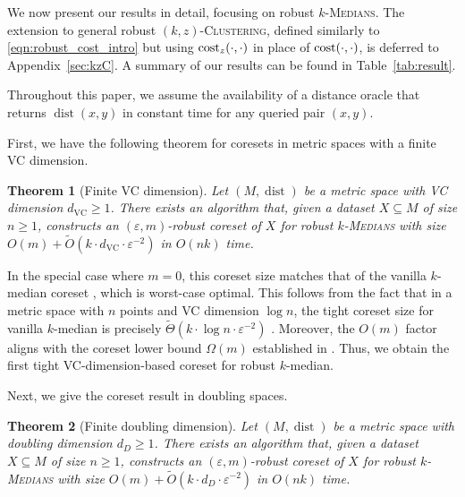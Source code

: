 \documentclass[11pt,letterpaper]{article}
\newtheorem{theorem}{Theorem}[section]
\theoremstyle{definition}
\newcommand{\eps}{\varepsilon}
\newcommand{\VC}{\ensuremath{\mathrm{VC}}}
\newcommand{\ProblemName}[1]{\textsc{#1}}
\newcommand{\kzC}{\ProblemName{$(k, z)$-Clustering}\xspace}
\newcommand{\kMedian}{\ProblemName{$k$-Medians}\xspace}
\DeclareMathOperator{\dist}{dist}
\begin{document}
We now present our results in detail, focusing on robust \kMedian.
The extension to general robust \kzC, defined similarly to \eqref{eqn:robust_cost_intro} but using 
$\cost_z(\cdot,\cdot)$ in place of $\cost(\cdot,\cdot)$, is deferred to Appendix~\ref{sec:kzC}. A summary of our results can be found in Table~\ref{tab:result}. 
%
%

Throughout this paper, we assume the availability of a distance oracle that returns \( \dist(x,y) \) in constant time for any queried pair \( (x,y) \).
%

First, we have the following theorem for coresets in metric spaces with a finite VC dimension.
%

\begin{theorem}[Finite VC dimension] \label{thm_gen} 
Let $(M,\dist)$ be a metric space with VC dimension $d_{\VC}\geq 1$. 
%
There exists an algorithm that, given a dataset $X\subseteq M$ of size $n\geq 1$, constructs an $(\eps,m)$-robust coreset of 
$X$ for robust \kMedian with size $O(m)+\tilde{O}(k\cdot d_{\VC}\cdot \eps^{-2})$ in $O(nk)$ time.
\end{theorem}

In the special case where \( m = 0 \), this coreset size matches that of the vanilla \( k \)-median coreset \cite{Cohen25}, which is worst-case optimal. 
%
This follows from the fact that in a metric space with $n$ points and VC dimension \( \log n \), the tight coreset size for vanilla \( k \)-median is precisely \( \tilde{\Theta}(k \cdot \log n \cdot \eps^{-2}) \) \cite{cohen2021new,Cohen2022Towards}.  
%
Moreover, the \( O(m) \) factor aligns with the coreset lower bound \( \Omega(m) \) established in \cite{huang2022near}.  
%
Thus, we obtain the first tight VC-dimension-based coreset for robust \( k \)-median.

Next, we give the coreset result in doubling spaces.

\begin{theorem}[Finite doubling dimension] 
\label{thm_doubling} 
Let $(M,\dist)$ be a metric space with doubling dimension $d_D\geq 1$.
%
There exists an algorithm that, given a dataset $X\subseteq M$ of size $n\geq 1$, constructs an $(\eps,m)$-robust coreset of 
$X$ for robust \kMedian with size $O(m)+\tilde{O}(k\cdot d_D\cdot \eps^{-2})$ in $O(nk)$ time.
\end{theorem}
\end{document}
